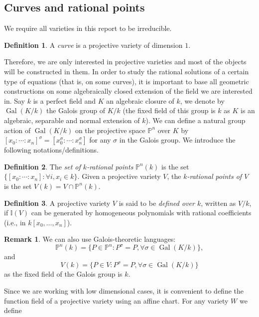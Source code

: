 \documentclass[12pt]{article}
\theoremstyle{remark}
\theoremstyle{definition}
\newtheorem{remark}{Remark}[subsection]
\newtheorem{definition}{Definition}[subsection]
\newcommand{\s}[0]{\sigma}
\newcommand{\Gal}[0]{\operatorname{Gal}}
\begin{document}
        \subsection{Curves and rational points}\label{sec-rat}
            We require all varieties in this report to be irreducible.
            \begin{definition}\label{def-curve}
                A \textit{curve} is a projective variety of dimension $1$.
            \end{definition}
            \noindent Therefore, we are only interested in projective varieties and most of the objects will be constructed in them. In order to study the rational solutions of a certain type of equations (that is, on some curves), it is important to base all geometric constructions on some algebraically closed extension of the field we are interested in. Say $k$ is a perfect field and $K$ an algebraic closure of $k$, we denote by $\Gal(K/k)$ the Galois group of $K/k$ (the fixed field of this group is $k$ as $K$ is an algebraic, separable and normal extension of $k$). We can define a natural group action of $\Gal(K/k)$ on the projective space $\mathbb P^n$ over $K$ by $[x_0:\cdots: x_n]^\sigma =[x_0^\sigma:\cdots: x_n^\sigma]$ for any $\sigma$ in the Galois group. We introduce the following notations/definitions.
            \begin{definition}
                The \textit{set of $k$-rational points} $\mathbb P^n(k)$ is the set $\{[x_0:\cdots:x_n]: \forall i, x_i\in k\}$. Given a projective variety $V$, the \textit{$k$-rational points of $V$} is the set $V(k)=V\cap \mathbb P^n(k)$.
            \end{definition}
            \begin{definition}
                A projective variety $V$ is said to be \textit{defined over $k$}, written as $V/k$, if $\mathbb I(V)$ can be generated by homogeneous polynomials with rational coefficients (i.e., in $k[x_0,\dots, x_n]$).
            \end{definition}
            \begin{remark}
                We can also use Galois-theoretic languages:
                \[\mathbb P^n(k)=\{P\in \mathbb P^n:P^\s = P,\forall\s \in\Gal(K/k)\},\]
                and
                \[V(k)=\{P\in V:P^\s = P,\forall\s \in\Gal(K/k)\}\]
                as the fixed field of the Galois group is $k$.
            \end{remark}
            Since we are working with low dimensional cases, it is convenient to define the function field of a projective variety using an affine chart. For any variety $W$ we define 
\end{document}
